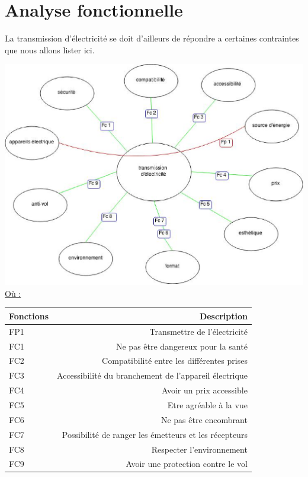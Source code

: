 \documentclass[12pt]{report}
\begin{document}
\section{Analyse fonctionnelle}
  La transmission d'électricité se doit d'ailleurs de répondre a certaines contraintes que nous allons lister ici.
\begin{center}
  \includegraphics[width=1\textwidth]{pieuvre}
  \underline{Où :} \\
  \begin{tabular}{| l || r |}
  
    \hline
    Fonctions & Description \\
    \hline
    FP1 & Transmettre de l’électricité \\
    FC1 & Ne pas être dangereux pour la santé \\
    FC2 & Compatibilité entre les différentes prises \\
    FC3 & Accessibilité du branchement de l’appareil électrique \\
    FC4 & Avoir un prix accessible \\
    FC5 & Etre agréable à la vue \\
    FC6 & Ne pas être encombrant \\
    FC7 & Possibilité de ranger les émetteurs et les récepteurs \\
    FC8 & Respecter l’environnement \\
    FC9 & Avoir une protection contre le vol \\
    \hline
    
  \end{tabular}
\end{center}
\end{document}
